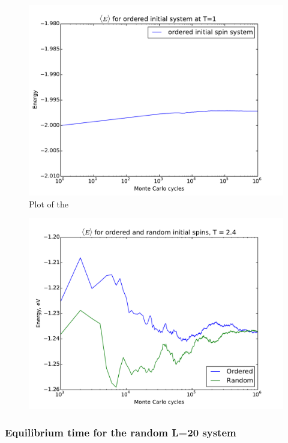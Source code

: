 \begin{figure}[H]
	\centering
	\includegraphics[width=0.7\linewidth]{../results/4c/order_T1_start}
	\caption{ Plot of the  }
	\label{fig:ranorder_t1_start}
\end{figure}
\begin{figure}[H]
		\centering
	\includegraphics[width=0.7\linewidth]{../results/4c/ran_order_T2}
	\caption{}
	\label{fig:ranordert2}
\end{figure}






\subsubsection{Equilibrium time  for the random L=20 system}






